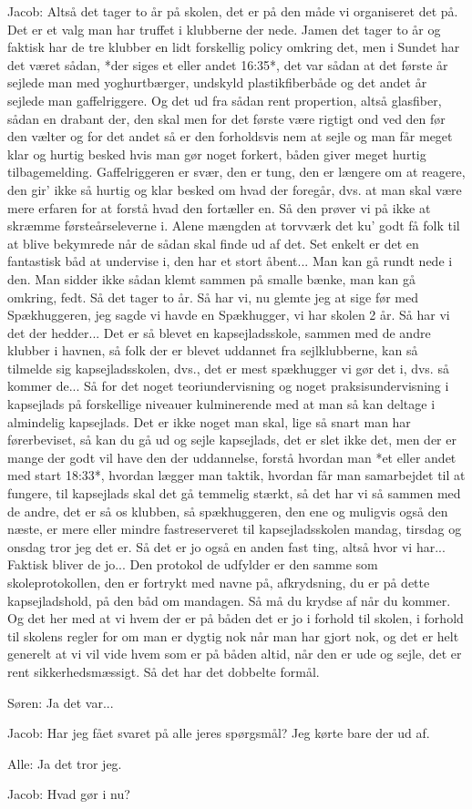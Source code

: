 Jacob: Altså det tager to år på skolen, det er på den måde vi organiseret det på. Det er et valg man har truffet i klubberne der nede. Jamen det tager to år og faktisk har de tre klubber en lidt forskellig policy omkring det, men i Sundet har det været sådan, *der siges et eller andet 16:35*, det var sådan at det første år sejlede man med yoghurtbærger, undskyld plastikfiberbåde og det andet år sejlede man gaffelriggere. Og det ud fra sådan rent propertion, altså glasfiber, sådan en drabant der, den skal men for det første være rigtigt ond ved den før den vælter og for det andet så er den forholdsvis nem at sejle og man får meget klar og hurtig besked hvis man gør noget forkert, båden giver meget hurtig tilbagemelding. Gaffelriggeren er  svær, den er tung, den er længere om at reagere, den gir' ikke så hurtig og klar besked om hvad der foregår, dvs. at man skal være mere erfaren for at forstå hvad den fortæller en. Så den prøver vi på ikke at skræmme førsteårseleverne i. Alene mængden at torvværk det ku' godt få folk til at blive bekymrede når de sådan skal finde ud af det. Set enkelt er det en fantastisk båd at undervise i, den har et stort åbent... Man kan gå rundt nede i den. Man sidder ikke sådan klemt sammen på smalle bænke, man kan gå omkring, fedt. Så det tager to år. Så har vi, nu glemte jeg at sige før med Spækhuggeren, jeg sagde vi havde en Spækhugger, vi har skolen 2 år. Så har vi det der hedder... Det er så blevet en kapsejladsskole, sammen med de andre klubber i havnen, så folk der er blevet uddannet fra sejlklubberne, kan så tilmelde sig kapsejladsskolen, dvs., det er mest spækhugger vi gør det i, dvs. så kommer de... Så for det noget teoriundervisning og noget praksisundervisning i kapsejlads på forskellige niveauer kulminerende med at man så kan deltage i almindelig kapsejlads. Det er ikke noget man skal, lige så snart man har førerbeviset, så kan du gå ud og sejle kapsejlads, det er slet ikke det, men der er mange der godt vil have den der uddannelse, forstå hvordan man *et eller andet med start 18:33*, hvordan lægger man taktik, hvordan får man samarbejdet til at fungere, til kapsejlads skal det gå temmelig stærkt, så det har vi så sammen med de andre, det er så os klubben, så spækhuggeren, den ene og muligvis også den næste, er mere eller mindre fastreserveret til kapsejladsskolen mandag, tirsdag og onsdag tror jeg det er. Så det er jo også en anden fast ting, altså hvor vi har... Faktisk bliver de jo... Den protokol de udfylder er den samme som skoleprotokollen, den er fortrykt med navne på, afkrydsning, du er på dette kapsejladshold, på den båd om mandagen. Så må du krydse af når du kommer. Og det her med at vi hvem der er på båden det er jo i forhold til skolen, i forhold til skolens regler for om man er dygtig nok når man har gjort nok, og det er helt generelt at vi vil vide hvem som er på båden altid, når den er ude og sejle, det er rent sikkerhedsmæssigt. Så det har det dobbelte formål. 

Søren: Ja det var...

Jacob: Har jeg fået svaret på alle jeres spørgsmål? Jeg kørte bare der ud af. 

Alle: Ja det tror jeg.

Jacob: Hvad gør i nu?









